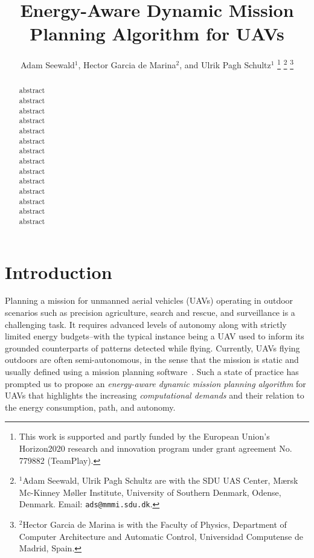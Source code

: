 \documentclass[letterpaper,10pt,conference]{ieeeconf}
\title{\LARGE \bf
Energy-Aware Dynamic Mission Planning Algorithm for UAVs
}
\author{
  Adam Seewald$^{1}$, Hector Garcia de Marina$^{2}$, and Ulrik Pagh Schultz$^{1}$
  \thanks{This work is supported and partly funded by the European Union's Horizon2020 research and innovation program under grant agreement No. 779882 (TeamPlay).
  }
  \thanks{$^{1}$Adam Seewald, Ulrik Pagh Schultz are with the SDU UAS Center, M{\ae}rsk Mc-Kinney M{\o}ller Institute, University of Southern Denmark, Odense, Denmark. Email: {\tt\small ads@mmmi.sdu.dk}.}
  \thanks{$^{2}$Hector Garcia de Marina is with the Faculty of Physics, Department of Computer Architecture and Automatic Control, Universidad Computense de Madrid, Spain.}
}
\begin{document}
\maketitle

\thispagestyle{empty}
\pagestyle{empty}

\begin{abstract}

  abstract\\
  abstract\\
  abstract\\
  abstract\\
  abstract\\
  abstract\\
  abstract\\
  abstract\\
  abstract\\
  abstract\\
  abstract\\
  abstract\\
  abstract\\
  abstract
\end{abstract}

%
\IEEEpeerreviewmaketitle


\section{Introduction}
\label{sec:intro}


Planning a mission for unmanned aerial vehicles (UAVs) operating in outdoor scenarios such as precision agriculture, search and rescue, and surveillance is a challenging task. It requires advanced levels of autonomy along with strictly limited energy budgets--with the typical instance being a UAV used to inform its grounded counterparts of patterns detected while flying. Currently, UAVs flying outdoors are often semi-autonomous, in the sense that the mission is static and usually defined using a mission planning software~\cite{daponte2019review}. Such a state of practice has prompted us to propose an \emph{energy-aware dynamic mission planning algorithm} for UAVs that highlights the increasing \emph{computational demands} and their relation to the energy consumption, path, and autonomy.
\end{document}
